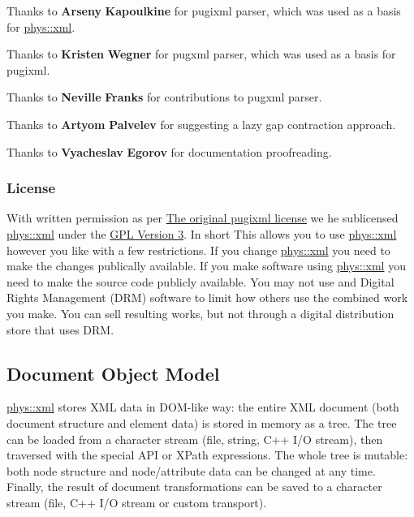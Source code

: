  Thanks to {\bfseries Arseny} {\bfseries Kapoulkine} for pugixml parser, which was used as a basis for \hyperlink{namespacephys_1_1xml}{phys::xml}. \par
 \par
 Thanks to {\bfseries Kristen} {\bfseries Wegner} for pugxml parser, which was used as a basis for pugixml. \par
 \par
 Thanks to {\bfseries Neville} {\bfseries Franks} for contributions to pugxml parser. \par
 \par
 Thanks to {\bfseries Artyom} {\bfseries Palvelev} for suggesting a lazy gap contraction approach. \par
 \par
 Thanks to {\bfseries Vyacheslav} {\bfseries Egorov} for documentation proofreading. \hypertarget{XMLManual_XMLLicense}{}\subsubsection{License}\label{XMLManual_XMLLicense}
With written permission as per \hyperlink{OriginalpugixmlLicense}{The original pugixml license} we he sublicensed \hyperlink{namespacephys_1_1xml}{phys::xml} under the \hyperlink{GPLLicense}{GPL Version 3}. In short This allows you to use \hyperlink{namespacephys_1_1xml}{phys::xml} however you like with a few restrictions. If you change \hyperlink{namespacephys_1_1xml}{phys::xml} you need to make the changes publically available. If you make software using \hyperlink{namespacephys_1_1xml}{phys::xml} you need to make the source code publicly available. You may not use and Digital Rights Management (DRM) software to limit how others use the combined work you make. You can sell resulting works, but not through a digital distribution store that uses DRM.\hypertarget{XMLManual_XMLDOM}{}\subsection{Document Object Model}\label{XMLManual_XMLDOM}
\hyperlink{namespacephys_1_1xml}{phys::xml} stores XML data in DOM-\/like way: the entire XML document (both document structure and element data) is stored in memory as a tree. The tree can be loaded from a character stream (file, string, C++ I/O stream), then traversed with the special API or XPath expressions. The whole tree is mutable: both node structure and node/attribute data can be changed at any time. Finally, the result of document transformations can be saved to a character stream (file, C++ I/O stream or custom transport).

